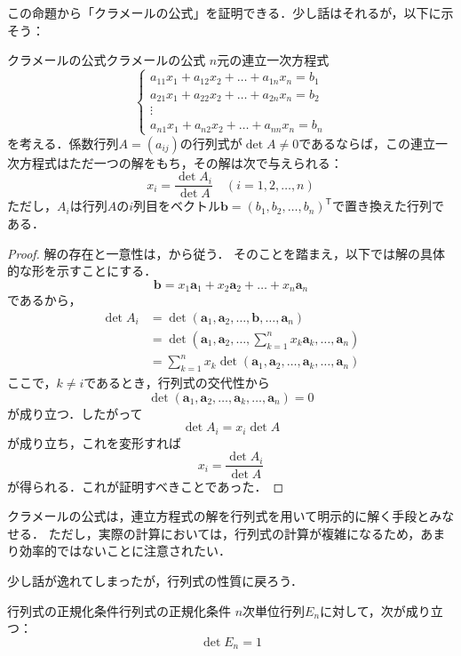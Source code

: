この命題から「クラメールの公式」を証明できる．少し話はそれるが，以下に示そう：


\begin{prop}{クラメールの公式}{クラメールの公式}
  $n$元の連立一次方程式
  \[
  \begin{cases}
    a_{11} x_1 + a_{12} x_2 + \dots + a_{1n} x_n = b_1 \\
    a_{21} x_1 + a_{22} x_2 + \dots + a_{2n} x_n = b_2 \\
    \vdots \\
    a_{n1} x_1 + a_{n2} x_2 + \dots + a_{nn} x_n = b_n
  \end{cases}
  \]
  を考える．係数行列$A = (a_{ij})$の行列式が$\det A \ne 0$であるならば，この連立一次方程式はただ一つの解をもち，その解は次で与えられる：
  \[
  x_i = \frac{\det A_i}{\det A} \quad (i=1, 2, \dots, n)
  \]
  ただし，$A_i$は行列$A$の$i$列目をベクトル$\bm{b} = (b_1, b_2, \dots, b_n)^\mathsf{T}$で置き換えた行列である．
\end{prop}

\begin{leftbar}
\begin{proof}
  解の存在と一意性は，から従う．
  そのことを踏まえ，以下では解の具体的な形を示すことにする．
  \[
   \bm{b}= x_1 \bm{a}_1+x_2 \bm{a}_2+\dots + x_n \bm{a}_n
  \]
  であるから，
  \begin{align*}
  \det A_i & = \det (\bm{a}_1,\bm{a}_2,\dots,\bm{b},\dots,\bm{a}_n) \\
  & = \det (\bm{a}_1,\bm{a}_2,\dots, \sum_{k=1}^n x_k \bm{a}_k ,\dots,\bm{a}_n) \\
  & = \sum_{k=1}^n x_k \det (\bm{a}_1,\bm{a}_2,\dots, \bm{a}_k ,\dots,\bm{a}_n) 
  \end{align*}
  ここで，$k \ne i$であるとき，行列式の交代性から
  \[
  \det (\bm{a}_1,\bm{a}_2,\dots, \bm{a}_k ,\dots,\bm{a}_n) = 0
  \]
  が成り立つ．したがって
  \[
  \det A_i = x_i \det A
  \]
  が成り立ち，これを変形すれば
  \[
  x_i = \frac{\det A_i}{\det A}
  \]
  が得られる．これが証明すべきことであった．
\end{proof}
\end{leftbar}

クラメールの公式は，連立方程式の解を行列式を用いて明示的に解く手段とみなせる．
ただし，実際の計算においては，行列式の計算が複雑になるため，あまり効率的ではないことに注意されたい．

少し話が逸れてしまったが，行列式の性質に戻ろう．

\begin{prop}{行列式の正規化条件}{行列式の正規化条件}
  $n$次単位行列$E_n$に対して，次が成り立つ：
  \[
  \det E_n = 1
  \]
\end{prop}

